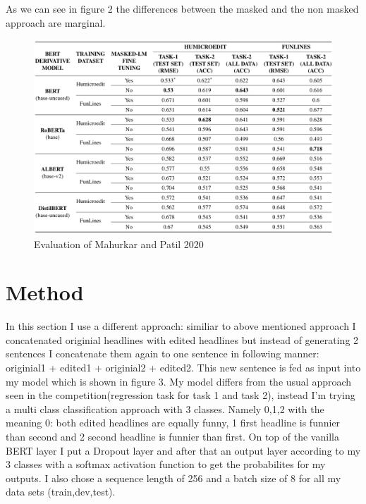 \documentclass[11pt,a4paper,onecolumn,oneside,notitlepage]{article}
\begin{document}
    As we can see in figure 2  the differences between the masked and the non masked approach are marginal.
    			\begin{figure}
    	\begin{center}
    		\includegraphics[width=1.0\linewidth]{eval_tab.png}
    	\end{center}
    	
    	\caption{Evaluation of Mahurkar and Patil 2020}\label{fig2}
    \end{figure}	
	\section{Method}
	In this section I use a different approach: similiar to above mentioned approach I concatenated originial headlines with edited headlines but instead of generating 2 sentences I concatenate them again to one sentence in following manner: originial1 + edited1 + originial2 + edited2.
	This new sentence is fed as input into my model which is shown in figure 3.
	My model differs from the usual approach seen in the competition(regression task for task 1 and task 2), instead I'm trying a multi class classification approach with 3 classes. Namely 0,1,2 with the meaning 0: both edited headlines are equally funny, 1 first headline is funnier than second and 2 second headline is funnier than first.
	On top of the vanilla BERT layer I put a Dropout layer and after that an output layer according to my 3 classes with a softmax activation function to get the probabilites for my outputs. 
	I also chose a sequence length of 256 and a batch size of 8 for all my data sets (train,dev,test).
	
\end{document}
